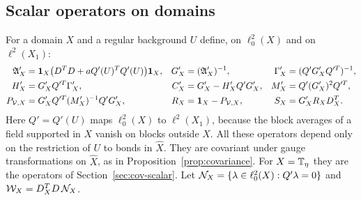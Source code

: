 \subsection{Scalar operators on domains}

For a domain $X$ and a regular background $U$ define, on $\ell^2_0(X)$ and on $\ell^2(X_1)$:
\begin{align*}
\mathfrak A'_X&=\mathbf 1_X\big(D^TD+aQ'(U)^TQ'(U)\big)\mathbf 1_X, & G'_X&=(\mathfrak A'_X)^{-1}, & \Gamma'_X&=(Q'G'_XQ'^T)^{-1},\\
H'_X&=G'_XQ'^T\Gamma'_X, & C'_X&=G'_X-H'_XQ'G'_X, & M'_X&=Q'(G'_X)^2Q'^T,\\
P_{\mathcal V,X}&=G'_XQ'^T(M'_X)^{-1}Q'G'_X, & R_X&=\mathbf 1_X-P_{\mathcal V,X}, & S_X&=G'_XR_XD^T_X .
\end{align*}
Here $Q'=Q'(U)$ maps $\ell^2_0(X)$ to $\ell^2(X_1)$, because the block averages of a field supported in $X$ vanish on blocks outside $X$. All these operators depend only on the restriction of $U$ to bonds in $\hat X$. They are covariant under gauge transformations on $\hat X$, as in Proposition~\ref{prop:covariance}. For $X=\mathbb T_\eta$ they are the operators of Section~\ref{sec:cov-scalar}. Let $\mathcal N_X=\{\lambda\in\ell^2_0(X):Q'\lambda=0\}$ and $\mathcal W_X=D^T_XD\,\mathcal N_X$.

